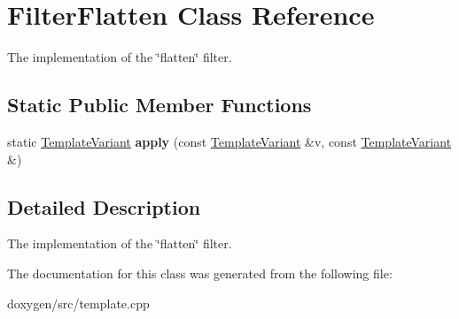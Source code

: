 \hypertarget{class_filter_flatten}{}\section{Filter\+Flatten Class Reference}
\label{class_filter_flatten}


The implementation of the \char`\"{}flatten\char`\"{} filter.  


\subsection*{Static Public Member Functions}
\begin{DoxyCompactItemize}
\item 
\mbox{\label{class_filter_flatten_a8f1e6fcc78c08e9dfeaf14c06fece350}} 
static \mbox{\hyperlink{class_template_variant}{Template\+Variant}} {\bfseries apply} (const \mbox{\hyperlink{class_template_variant}{Template\+Variant}} \&v, const \mbox{\hyperlink{class_template_variant}{Template\+Variant}} \&)
\end{DoxyCompactItemize}


\subsection{Detailed Description}
The implementation of the \char`\"{}flatten\char`\"{} filter. 

The documentation for this class was generated from the following file\+:\begin{DoxyCompactItemize}
\item 
doxygen/src/template.\+cpp\end{DoxyCompactItemize}
